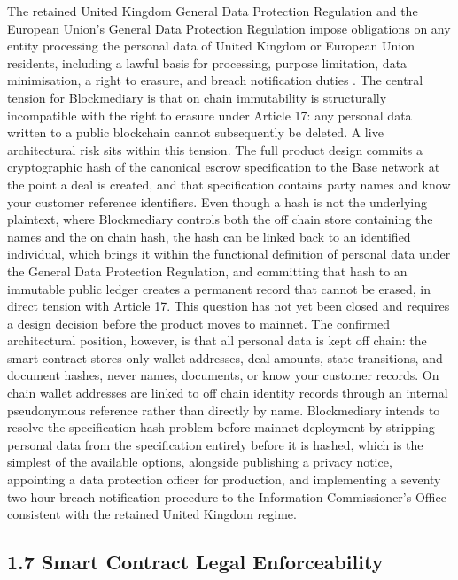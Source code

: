 \documentclass[12pt, a4paper]{article}
\begin{document}
The retained United Kingdom General Data Protection Regulation and the European Union's
General Data Protection Regulation impose obligations on any entity processing the
personal data of United Kingdom or European Union residents, including a lawful basis for
processing, purpose limitation, data minimisation, a right to erasure, and breach
notification duties \citep{gdpr2016}. The central tension for Blockmediary is that on
chain immutability is structurally incompatible with the right to erasure under Article
17: any personal data written to a public blockchain cannot subsequently be deleted. A
live architectural risk sits within this tension. The full product design commits a
cryptographic hash of the canonical escrow specification to the Base network at the point
a deal is created, and that specification contains party names and know your customer
reference identifiers. Even though a hash is not the underlying plaintext, where
Blockmediary controls both the off chain store containing the names and the on chain hash,
the hash can be linked back to an identified individual, which brings it within the
functional definition of personal data under the General Data Protection Regulation, and
committing that hash to an immutable public ledger creates a permanent record that cannot
be erased, in direct tension with Article 17. This question has not yet been closed and
requires a design decision before the product moves to mainnet. The confirmed
architectural position, however, is that all personal data is kept off chain: the smart
contract stores only wallet addresses, deal amounts, state transitions, and document
hashes, never names, documents, or know your customer records. On chain wallet addresses
are linked to off chain identity records through an internal pseudonymous reference rather
than directly by name. Blockmediary intends to resolve the specification hash problem
before mainnet deployment by stripping personal data from the specification entirely
before it is hashed, which is the simplest of the available options, alongside publishing a
privacy notice, appointing a data protection officer for production, and implementing a
seventy two hour breach notification procedure to the Information Commissioner's Office
consistent with the retained United Kingdom regime.

\subsection*{1.7 Smart Contract Legal Enforceability}
\end{document}
